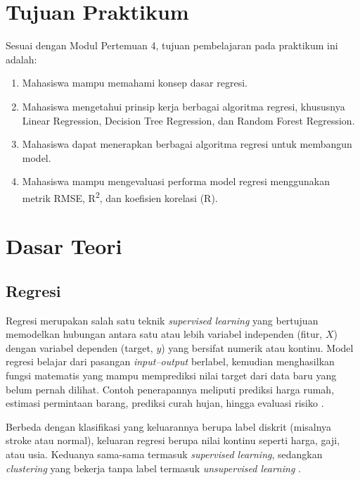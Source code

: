 \documentclass[a4paper,oneside,12pt]{report}
\begin{document}
\setcounter{page}{3}

\chapter[Tujuan Praktikum]{Tujuan Praktikum}
Sesuai dengan Modul Pertemuan 4, tujuan pembelajaran pada praktikum ini adalah:
\begin{enumerate}
   \item Mahasiswa mampu memahami konsep dasar regresi.
   \item Mahasiswa mengetahui prinsip kerja berbagai algoritma regresi, khususnya Linear Regression, Decision Tree Regression, dan Random Forest Regression.
   \item Mahasiswa dapat menerapkan berbagai algoritma regresi untuk membangun model.
   \item Mahasiswa mampu mengevaluasi performa model regresi menggunakan metrik RMSE, R\textsuperscript{2}, dan koefisien korelasi (R).
\end{enumerate}

\clearpage

\chapter{Dasar Teori}

\section{Regresi}
Regresi merupakan salah satu teknik \textit{supervised learning} yang bertujuan memodelkan hubungan antara satu atau lebih variabel independen (fitur, $X$) dengan variabel dependen (target, $y$) yang bersifat numerik atau kontinu. Model regresi belajar dari pasangan \textit{input--output} berlabel, kemudian menghasilkan fungsi matematis yang mampu memprediksi nilai target dari data baru yang belum pernah dilihat. Contoh penerapannya meliputi prediksi harga rumah, estimasi permintaan barang, prediksi curah hujan, hingga evaluasi risiko \cite{han2022,aws-linear,dicoding-regresi}.

Berbeda dengan klasifikasi yang keluarannya berupa label diskrit (misalnya stroke atau normal), keluaran regresi berupa nilai kontinu seperti harga, gaji, atau usia. Keduanya sama-sama termasuk \textit{supervised learning}, sedangkan \textit{clustering} yang bekerja tanpa label termasuk \textit{unsupervised learning} \cite{han2022,trivusi-aimldl}.
\end{document}
